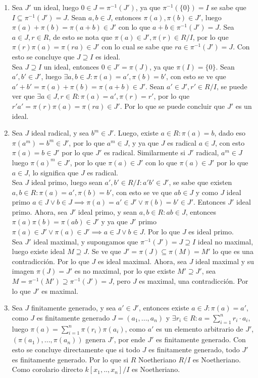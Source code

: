 \begin{sol}{1.22}
    \begin{enumerate}[label=(\alph*)]
        \item Sea $J'$ un ideal, luego $0\in J=\pi^{-1}(J')$, ya que $\pi^{-1}(\{0\})=I$ se sabe que $I\subseteq \pi^{-1}(J')=J$. Sean $a,b\in J$, entonces $\pi(a),\pi(b)\in J'$, luego $\pi(a)+\pi(b)=\pi(a+b)\in J'$ con lo que $a+b\in \pi^{-1}(J')=J$. Sea $a\in J, r\in R$, de esto se nota que $\pi(a)\in J', \pi(r)\in R/I$, por lo que $\pi(r)\pi(a)=\pi(ra)\in J'$ con lo cual se sabe que $ra\in\pi^{-1}(J')=J$. Con esto se concluye que $J\supseteq I$ es ideal.\\
        Sea $J\supseteq I$ un ideal, entonces $0\in J'=\pi(J)$, ya que $\pi(I)=\{0\}$. Sean $a',b'\in J'$, luego $\exists a,b\in J: \pi(a)=a',\pi(b)=b'$, con esto se ve que $a'+b'=\pi(a)+\pi(b)=\pi(a+b)\in J'$. Sean $a'\in J', r'\in R/I$, se puede ver que $\exists a\in J, r\in R:\pi(a)=a',\pi(r)=r'$, por lo que $r'a'=\pi(r)\pi(a)=\pi(ra)\in J'$. Por lo que se puede concluir que $J'$ es un ideal.
        \item Sea $J$ ideal radical, y sea $b^m\in J'$. Luego, existe $a\in R:\pi(a)=b$, dado eso $\pi(a^m)=b^m\in J'$, por lo que $a^m\in J$, y ya que $J$ es radical $a\in J$, con esto $\pi(a)=b\in J'$ por lo que $J'$ es radical. Similarmente si $J'$ radical, $a^m\in J$ luego $\pi(a)^m\in J'$, por lo que $\pi(a)\in J'$ con lo que $\pi(a)\in J'$ por lo que $a\in J$, lo significa que $J$ es radical.\\
        Sea $J$ ideal primo, luego sean $a',b'\in R/I: a'b'\in J'$, se sabe que existen $a,b\in R: \pi(a)=a', \pi(b)=b'$, con esto se ve que $ab\in J$ y como $J$ ideal primo $a\in J\vee b\in J\implies \pi(a)=a'\in J'\vee\pi(b)=b'\in J'$. Entonces $J'$ ideal primo. Ahora, sea $J'$ ideal primo, y sean $a,b\in R: ab\in J$, entonces $\pi(a)\pi(b)=\pi(ab)\in J'$ y ya que $J'$ primo $\pi(a)\in J'\vee \pi(a)\in J'\implies a\in J\vee b\in J$. Por lo que $J$ es ideal primo.\\
        Sea $J'$ ideal maximal, y supongamos que $\pi^{-1}(J')=J\supseteq I$ ideal no maximal, luego existe ideal $M\supseteq J$. Se ve que $J'=\pi(J)\subseteq\pi(M)=M'$ lo que es una contradicción. Por lo que $J$ es ideal maximal. Ahora, sea $J$ ideal maximal y su imagen $\pi(J)=J'$ es no maximal, por lo que existe $M'\supseteq J'$, sea $M=\pi^{-1}(M')\supseteq \pi^{-1}(J')=J$, pero $J$ es maximal, una contradicción. Por lo que $J'$ es maximal.
        \item Sea $J$ finitamente generado, y sea $a'\in J'$, entonces existe $a\in J:\pi(a)=a'$, como $J$ es finitamente generado $J=(a_1,...,a_n)$ y $\exists r_i\in R: a=\sum_{i=1}^nr_i\cdot a_i$, luego $\pi(a)=\sum_{i=1}^n\pi(r_i)\pi(a_i)$, como $a'$ es un elemento arbitrario de $J'$, $(\pi(a_1),...,\pi(a_n))$ genera $J'$, por ende $J'$ es finitamente generado. Con esto se concluye directamente que si todo $J$ es finitamente generado, todo $J'$ es finitamente generado. Por lo que si $R$ Noetheriano $R/I$ es Noetheriano. Como corolario directo $k[x_1,..,x_n]/I$ es Noetheriano.
    \end{enumerate}
\end{sol}
